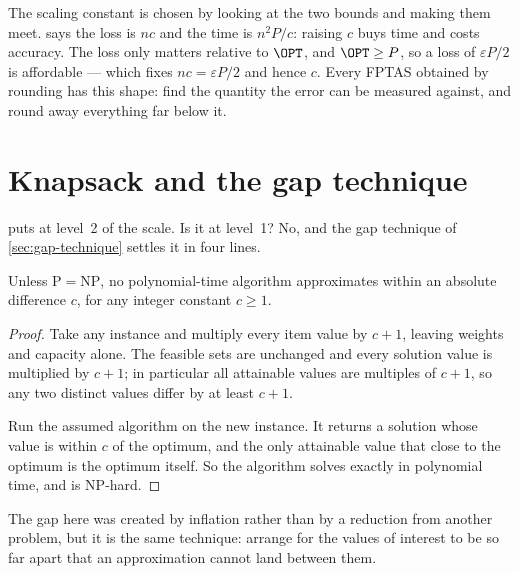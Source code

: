 \begin{intuition}
The scaling constant is chosen by looking at the two bounds and making them
meet.  says the loss is $nc$ and the time is
$n^2P/c$: raising $c$ buys time and costs accuracy. The loss only matters
relative to $\OPT$, and $\OPT \ge P$, so a loss of $\varepsilon P/2$ is
affordable --- which fixes $nc = \varepsilon P/2$ and hence $c$. Every FPTAS
obtained by rounding has this shape: find the quantity the error can be
measured against, and round away everything far below it.
\end{intuition}

\section{Knapsack and the gap technique}
\label{sec:knapsack-gap}

 puts  at level~2 of the scale. Is it at
level~1? No, and the gap technique of \cref{sec:gap-technique} settles it in
four lines.

\begin{theorem}\label{thm:knapsack-no-additive}
Unless $\mathrm{P} = \mathrm{NP}$, no polynomial-time algorithm approximates
 within an absolute difference $c$, for any integer constant
$c \ge 1$.
\end{theorem}

\begin{proof}
Take any instance and multiply every item value by $c+1$, leaving weights and
capacity alone. The feasible sets are unchanged and every solution value is
multiplied by $c+1$; in particular all attainable values are multiples of
$c+1$, so any two distinct values differ by at least $c+1$.

Run the assumed algorithm on the new instance. It returns a solution whose value
is within $c$ of the optimum, and the only attainable value that close to the
optimum is the optimum itself. So the algorithm solves  exactly
in polynomial time, and  is \textrm{NP}-hard.
\end{proof}

The gap here was created by inflation rather than by a reduction from another
problem, but it is the same technique: arrange for the values of interest to be
so far apart that an approximation cannot land between them.

